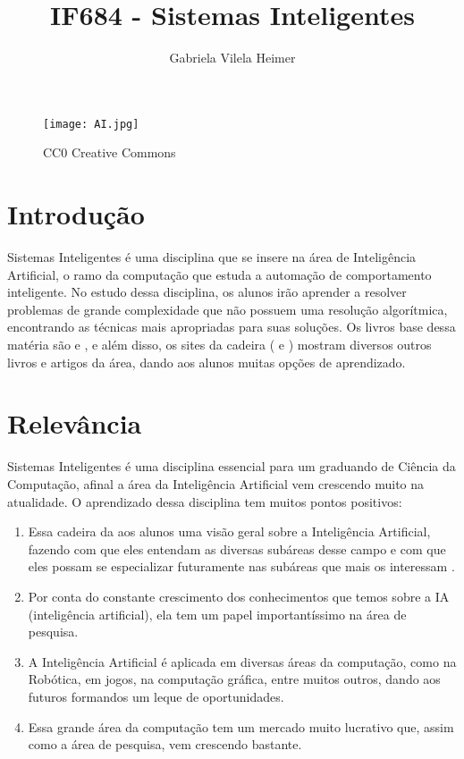 \documentclass[10pt,a4paper]{article}
\title{IF684 - Sistemas Inteligentes}
\author{Gabriela Vilela Heimer}
\begin{document}
\maketitle

\begin{figure}[h]
\centering
\texttt{[image: AI.jpg]}
\caption{\label{fig:AI}CC0 Creative Commons}
\end{figure}


\section{Introdução}

Sistemas Inteligentes é uma disciplina que se insere na área de Inteligência Artificial, o ramo da computação que estuda a automação de comportamento inteligente. No estudo dessa disciplina, os alunos irão aprender a resolver problemas de grande complexidade que não possuem uma resolução algorítmica, encontrando as técnicas mais apropriadas para suas soluções. Os livros base dessa matéria são \cite{AI:NewSynthesis} e \cite{AI:ModernApproach}, e além disso, os sites da cadeira (\cite{SiteCadeira1} e \cite{SiteCadeira2}) mostram diversos outros livros e artigos da área, dando aos alunos muitas opções de aprendizado.

\section{Relevância}

Sistemas Inteligentes é uma disciplina essencial para um graduando de Ciência da Computação, afinal a área da Inteligência Artificial vem crescendo muito na atualidade. O aprendizado dessa disciplina tem muitos pontos positivos:

\begin{enumerate}
\item Essa cadeira da aos alunos uma visão geral sobre a Inteligência Artificial, fazendo com que eles entendam as diversas subáreas desse campo e com que eles possam se especializar futuramente nas subáreas que mais os interessam .
\item Por conta do constante crescimento dos conhecimentos que temos sobre a IA (inteligência artificial), ela tem um papel importantíssimo na área de pesquisa.
\item A Inteligência Artificial é aplicada em diversas áreas da computação, como na Robótica, em jogos, na computação gráfica, entre muitos outros, dando aos futuros formandos um leque de oportunidades.
\item Essa grande área da computação tem um mercado muito lucrativo que,  assim como a área de pesquisa, vem crescendo bastante.
\end{enumerate}
\end{document}
